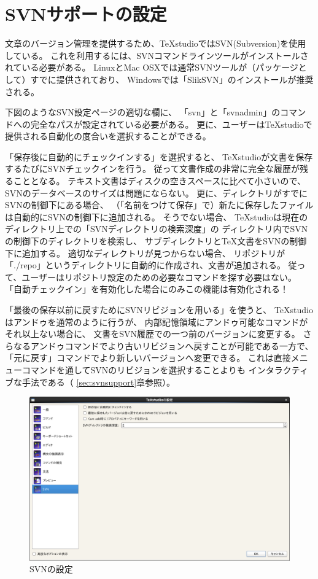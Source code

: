 \section{SVNサポートの設定}\label{sec:config_svn}

文章のバージョン管理を提供するため、TeXstudioではSVN(Subversion)を使用している。
これを利用するには、SVNコマンドラインツールがインストールされている必要がある。
LinuxとMac OSXでは通常SVNツールが（パッケージとして）すでに提供されており、
Windowsでは「SlikSVN」のインストールが推奨される。

下図のようなSVN設定ページの適切な欄に、
「svn」と「svnadmin」のコマンドへの完全なパスが設定されている必要がある。
更に、ユーザーはTeXstudioで提供される自動化の度合いを選択することができる。

「保存後に自動的にチェックインする」を選択すると、
TeXstudioが文書を保存するたびにSVNチェックインを行う。
従って文書作成の非常に完全な履歴が残ることとなる。
テキスト文書はディスクの空きスペースに比べて小さいので、
SVNのデータベースのサイズは問題にならない。
更に、ディレクトリがすでにSVNの制御下にある場合、
（「名前をつけて保存」で）新たに保存したファイルは自動的にSVNの制御下に追加される。
そうでない場合、
TeXstudioは現在のディレクトリ上での「SVNディレクトリの検索深度」の
ディレクトリ内でSVNの制御下のディレクトリを検索し、
サブディレクトリとTeX文書をSVNの制御下に追加する。
適切なディレクトリが見つからない場合、
リポジトリが「./repo」というディレクトリに自動的に作成され、文書が追加される。
従って、ユーザーはリポジトリ設定のための必要なコマンドを探す必要はない。
「自動チェックイン」を有効化した場合にのみこの機能は有効化される！

「最後の保存以前に戻すためにSVNリビジョンを用いる」を使うと、
TeXstudioはアンドゥを通常のように行うが、
内部記憶領域にアンドゥ可能なコマンドがそれ以上ない場合に、
文書をSVN履歴での一つ前のバージョンに変更する。
さらなるアンドゥコマンドでより古いリビジョンへ戻すことが可能である一方で、
「元に戻す」コマンドでより新しいバージョンへ変更できる。
これは直接メニューコマンドを通してSVNのリビジョンを選択することよりも
インタラクティブな手法である（
\ref{sec:svnsupport}章参照）。

\begin{figure}[H]
  \centering
  \includegraphics[width=.8\linewidth]{configure_svn.png}
  \caption{SVNの設定}
\end{figure}
